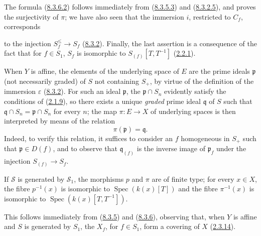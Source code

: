 The formula (\hyperref[II.8.3.6.2]{8.3.6.2}) follows immediately from
(\hyperref[II.8.3.5.3]{8.3.5.3}) and
(\hyperref[II.8.3.2.5]{8.3.2.5}), and proves the surjectivity of $\pi$; we
have also seen that the immersion $i$, restricted to $C_f$, corresponds

to the injection $S_f^{\leq}\to S_f$ (\hyperref[II.8.3.2]{8.3.2}). Finally, the
last assertion is a consequence of the fact that for $f\in S_1$, $S_f$ is
isomorphic to $S_{(f)}[T,T^{-1}]$ (\hyperref[II.2.2.1]{2.2.1}).

\begin{remark}[8.3.7]
\label{II.8.3.7}
When $Y$ is affine, the elements of the underlying space of $E$ are the
prime ideals $\mathfrak{p}$ (not necessarily graded) of $S$ not
containing $S_+$, by virtue of the definition of the immersion $\varepsilon$
(\hyperref[II.8.3.2]{8.3.2}). For such an ideal $\mathfrak{p}$, the
$\mathfrak{p}\cap S_n$ evidently satisfy the conditions of
(\hyperref[II.2.1.9]{2.1.9}), so there exists a unique \emph{graded} prime
ideal $\mathfrak{q}$ of $S$ such that
$\mathfrak{q}\cap S_n=\mathfrak{p}\cap S_n$ for every $n$; the map
$\pi:E\to X$ of underlying spaces is then interpreted by means of the relation
\begin{equation}
\label{II.8.3.7.1}
  \pi(\mathfrak{p})=\mathfrak{q}.
\tag{8.3.7.1}
\end{equation}
Indeed, to verify this relation, it suffices to consider an $f$
homogeneous in $S_+$ such that $\mathfrak{p}\in D(f)$, and to observe that
$\mathfrak{q}_{(f)}$ is the inverse image of $\mathfrak{p}_f$ under
the injection $S_{(f)}\to S_f$.
\end{remark}

\begin{corollary}[8.3.8]
\label{II.8.3.8}
If $\mathcal{S}$ is generated by $\mathcal{S}_1$, the morphisms $p$ and
$\pi$ are of finite type; for every $x\in X$, the fibre $p^{-1}(x)$ is
isomorphic to $\operatorname{Spec}(k(x)[T])$ and the fibre $\pi^{-1}(x)$ is
isomorphic to $\operatorname{Spec}(k(x)[T,T^{-1}])$.
\end{corollary}

This follows immediately from (\hyperref[II.8.3.5]{8.3.5}) and
(\hyperref[II.8.3.6]{8.3.6}), observing that, when $Y$ is affine and
$S$ is generated by $S_1$, the $X_f$, for $f\in S_1$, form a covering
of $X$ (\hyperref[II.2.3.14]{2.3.14}).

